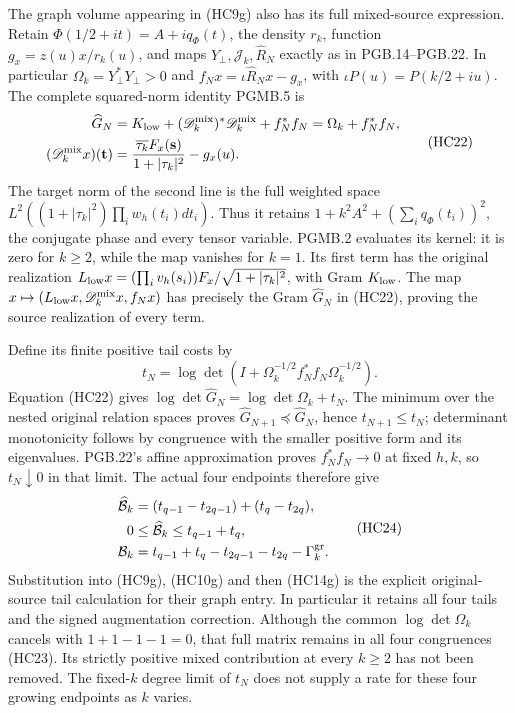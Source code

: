 The graph volume appearing in (HC9g) also has its full
mixed-source expression. Retain $\Phi(1/2+it)=A+iq_\Phi(t)$,
the density $r_k$, function $g_x=z(u)x/r_k(u)$, and maps
$Y_\perp,\mathscr J_k,\widehat R_N$ exactly as in PGB.14--PGB.22.
In particular $\Omega_k=Y_\perp^*Y_\perp>0$ and
$f_Nx=\iota\widehat R_Nx-g_x$, with $\iota P(u)=P(k/2+iu)$.
The complete squared-norm identity PGMB.5 is
\[
 \begin{aligned}
 \widehat G_N&=K_{\rm low}
             +(\mathscr D_k^{\rm mix})^*\mathscr D_k^{\rm mix}
             +f_N^*f_N=\Omega_k+f_N^*f_N,\\
 (\mathscr D_k^{\rm mix}x)(\mathbf t)
 &=\frac{\overline{\tau_k}F_x(\mathbf s)}{1+|\tau_k|^2}-g_x(u).
 \end{aligned}
 \tag{HC22}
\]
The target norm of the second line is the full weighted space
$L^2((1+|\tau_k|^2)\prod_iw_h(t_i)dt_i)$.
Thus it retains $1+k^2A^2+(\sum_iq_\Phi(t_i))^2$, the conjugate
phase and every tensor variable. PGMB.2 evaluates its kernel:
it is zero for $k\geq2$, while the map vanishes for $k=1$.
Its first term has the original realization
$L_{\rm low}x=(\prod_i v_h(s_i))F_x/\sqrt{1+|\tau_k|^2}$,
with Gram $K_{\rm low}$. The map
$x\mapsto(L_{\rm low}x,\mathscr D_k^{\rm mix}x,f_Nx)$
has precisely the Gram $\widehat G_N$ in (HC22), proving
the source realization of every term.

Define its finite positive tail costs by
\[
 t_N=\log\det(I+\Omega_k^{-1/2}f_N^*f_N\Omega_k^{-1/2}).
 \tag{HC23}
\]
Equation (HC22) gives
$\log\det\widehat G_N=\log\det\Omega_k+t_N$.
The minimum over the nested original relation spaces proves
$\widehat G_{N+1}\preceq\widehat G_N$, hence
$t_{N+1}\leq t_N$; determinant monotonicity follows by
congruence with the smaller positive form and its eigenvalues.
PGB.22's affine approximation proves $f_N^*f_N\to0$ at fixed
$h,k$, so $t_N\downarrow0$ in that limit. The actual four
endpoints therefore give
\[
 \begin{aligned}
 \widehat{\mathcal B}_k
   &=(t_{q-1}-t_{2q-1})+(t_q-t_{2q}),\\
 0&\leq\widehat{\mathcal B}_k\leq t_{q-1}+t_q,\\
 \mathcal B_k&=t_{q-1}+t_q-t_{2q-1}-t_{2q}
                                         -\Gamma_k^{\rm gr}.
 \end{aligned}
 \tag{HC24}
\]
Substitution into (HC9g), (HC10g) and then (HC14g) is the
explicit original-source tail calculation for their graph
entry. In particular it retains all four tails and the
signed augmentation correction. Although the common
$\log\det\Omega_k$ cancels with $1+1-1-1=0$, that full
matrix remains in all four congruences (HC23). Its strictly
positive mixed contribution at every $k\geq2$ has not been
removed. The fixed-$k$ degree limit of $t_N$ does not supply
a rate for these four growing endpoints as $k$ varies.

